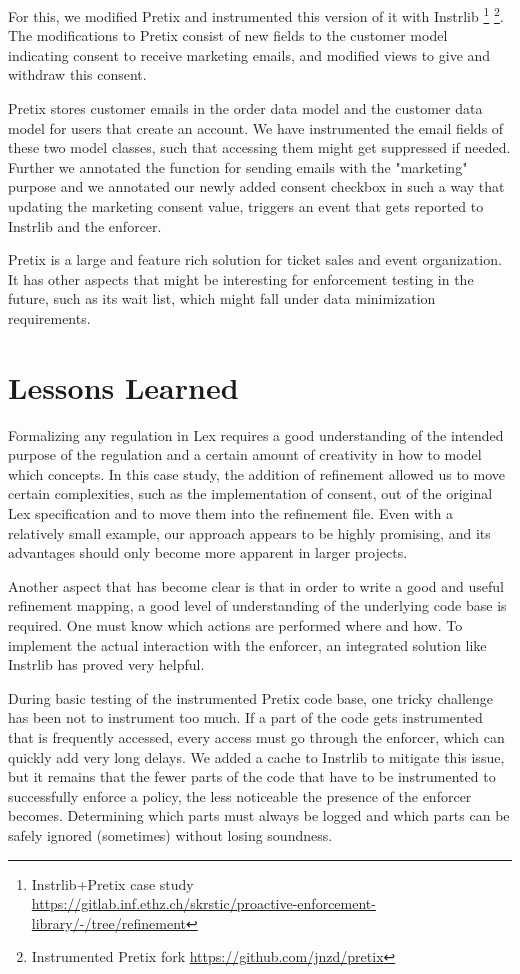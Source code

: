 For this, we modified Pretix and instrumented this version of it
with Instrlib
\footnote{Instrlib+Pretix case study\\
        \url{https://gitlab.inf.ethz.ch/skrstic/proactive-enforcement-library/-/tree/refinement}}
\footnote{Instrumented Pretix fork \url{https://github.com/jnzd/pretix}}.
The modifications to Pretix consist of new fields to
the customer model indicating consent to receive
marketing emails, and modified views to give
and withdraw this consent.

Pretix stores customer emails in the order data model and
the customer data model for users that create an account.
We have instrumented the email fields of these two model  classes,
such that accessing them might get suppressed if needed.
Further we annotated the function for sending emails with the
"marketing" purpose and we annotated our newly added
consent checkbox in such a way that updating the
marketing consent value, triggers an event that gets reported
to Instrlib and the enforcer.

Pretix is a large and feature rich solution for ticket sales and event organization.
It has other aspects that might be interesting for enforcement testing in the future,
such as its wait list, which might fall under data minimization requirements.


\section{Lessons Learned}
Formalizing any regulation in Lex requires a good understanding of
the intended purpose of the regulation and a certain amount of creativity
in how to model which concepts.
In this case study, the addition of
refinement allowed us to move certain complexities, such as
the implementation of consent, out of the
original Lex specification and to move them into the refinement file.
Even with a relatively small example, our approach appears to be highly
promising, and its advantages should only become more apparent in
larger projects.

Another aspect that has become clear is that in order to write a good
and useful refinement mapping, a good level of understanding of the underlying
code base is required.
One must know which actions are performed where and how.
To implement the actual interaction with the enforcer,
an integrated solution like Instrlib has proved very helpful.

During basic testing of the instrumented Pretix code base, one tricky
challenge has been not to instrument too much.
If a part of the code gets instrumented that is frequently accessed,
every access must go through the enforcer, which can quickly add
very long delays.
We added a cache to Instrlib to mitigate this issue, but
it remains that the fewer parts of the code that have to be instrumented
to successfully enforce a policy, the less noticeable the presence
of the enforcer becomes.
Determining which parts must always be logged and which parts
can be safely ignored (sometimes) without losing soundness.
